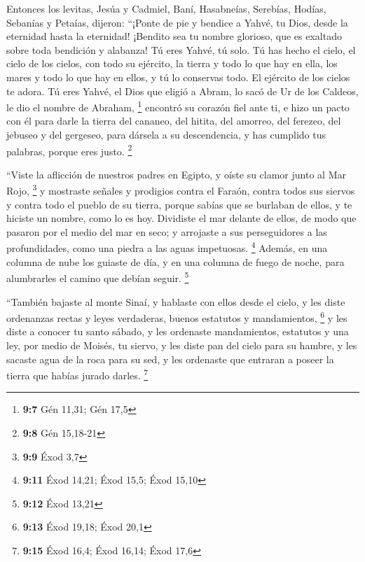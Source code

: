  Entonces los levitas, Jesúa y Cadmiel, Baní, Hasabneías,
Serebías, Hodías, Sebanías y Petaías, dijeron: ``¡Ponte de pie y bendice
a Yahvé, tu Dios, desde la eternidad hasta la eternidad! ¡Bendito sea tu
nombre glorioso, que es exaltado sobre toda bendición y alabanza!
 Tú eres Yahvé, tú solo. Tú has hecho el cielo, el cielo
de los cielos, con todo su ejército, la tierra y todo lo que hay en
ella, los mares y todo lo que hay en ellos, y tú lo conservas todo. El
ejército de los cielos te adora.  Tú eres Yahvé, el Dios
que eligió a Abram, lo sacó de Ur de los Caldeos, le dio el nombre de
Abraham, \footnote{\textbf{9:7} Gén 11,31; Gén 17,5} 
encontró su corazón fiel ante ti, e hizo un pacto con él para darle la
tierra del cananeo, del hitita, del amorreo, del ferezeo, del jebuseo y
del gergeseo, para dársela a su descendencia, y has cumplido tus
palabras, porque eres justo. \footnote{\textbf{9:8} Gén 15,18-21}

 ``Viste la aflicción de nuestros padres en Egipto, y
oíste su clamor junto al Mar Rojo, \footnote{\textbf{9:9} Éxod 3,7}
 y mostraste señales y prodigios contra el Faraón, contra
todos sus siervos y contra todo el pueblo de su tierra, porque sabías
que se burlaban de ellos, y te hiciste un nombre, como lo es hoy.
 Dividiste el mar delante de ellos, de modo que pasaron
por el medio del mar en seco; y arrojaste a sus perseguidores a las
profundidades, como una piedra a las aguas impetuosas. \footnote{\textbf{9:11}
  Éxod 14,21; Éxod 15,5; Éxod 15,10}  Además, en una
columna de nube los guiaste de día, y en una columna de fuego de noche,
para alumbrarles el camino que debían seguir. \footnote{\textbf{9:12}
  Éxod 13,21}

 ``También bajaste al monte Sinaí, y hablaste con ellos
desde el cielo, y les diste ordenanzas rectas y leyes verdaderas, buenos
estatutos y mandamientos, \footnote{\textbf{9:13} Éxod 19,18; Éxod 20,1}
 y les diste a conocer tu santo sábado, y les ordenaste
mandamientos, estatutos y una ley, por medio de Moisés, tu siervo,
 y les diste pan del cielo para su hambre, y les sacaste
agua de la roca para su sed, y les ordenaste que entraran a poseer la
tierra que habías jurado darles. \footnote{\textbf{9:15} Éxod 16,4; Éxod
  16,14; Éxod 17,6}

